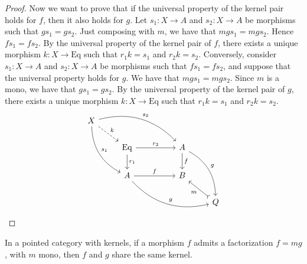 \begin{subbox}{}
\begin{proof}
    Now we want to prove that if the universal property of the kernel pair holds for $f$, then it also holds for $g$. Let $s_1:X \to A$ and $s_2:X \to A$ be morphisms such that $gs_1=gs_2$. Just composing with $m$, we have that $mgs_1=mgs_2$. Hence $fs_1=fs_2$. By the universal property of the kernel pair of $f$, there exists a unique morphism $k: X \to \mathrm{Eq}$ such that $r_1k=s_1$ and $r_2k=s_2$. Conversely, consider $s_1:X \to A$ and $s_2:X \to A$ be morphisms such that $fs_1=fs_2$, and suppose that the universal property holds for $g$. We have that $mgs_1=mgs_2$. Since $m$ is a mono, we have that $gs_1=gs_2$. By the universal property of the kernel pair of $g$, there exists a unique morphism $k: X \to \mathrm{Eq}$ such that $r_1k=s_1$ and $r_2k=s_2$.
        \[
\begin{tikzcd}
    X \arrow[rdd, "s_1", bend right] \arrow[rd, "k", dashed] \arrow[rrrd, "s_2", bend left] &                                                 &  &                                              &                         \\
                                                                                            & \mathrm{Eq} \arrow[d, "r_1"] \arrow[rr, "r_2"]  &  & A \arrow[d, "f"] \arrow[rdd, "g", bend left] &                         \\
                                                                                            & A \arrow[rr, "f"] \arrow[rrrd, "g", bend right] &  & B                                            &                         \\
                                                                                            &                                                 &  &                                              & Q \arrow[lu, "m", tail]
    \end{tikzcd}
    \]
    \end{proof}
\end{subbox}

\begin{mainbox}{}
    \begin{prop}\label{f and e share the kernel}
        In a pointed category with kernels, if a morphism $f$ admits a factorization $f=mg$, with $m$ mono, then $f$ and $g$ share the same kernel.
    \end{prop}
\end{mainbox}

